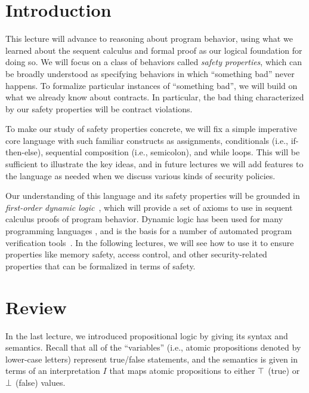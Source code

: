 \documentclass[11pt,twoside]{scrartcl}
\begin{document}
\newcommand{\atrace}{\sigma}%
\newcommand{\stdI}{\dTLint[state=\omega]}%
\newcommand{\Ip}{\dTLint[trace=\atrace]}%

\maketitle
\thispagestyle{empty}


\section{Introduction}

This lecture will advance to reasoning about program behavior, using what we learned about the sequent calculus and formal proof as our logical foundation for doing so. We will focus on a class of behaviors called \emph{safety properties}, which can be broadly understood as specifying behaviors in which ``something bad'' never happens. To formalize particular instances of ``something bad'', we will build on what we already know about contracts. In particular, the bad thing characterized by our safety properties will be contract violations.

To make our study of safety properties concrete, we will fix a simple imperative core language with such familiar constructs as assignments, conditionals (i.e., if-then-else), sequential composition (i.e., semicolon), and while loops. This will be sufficient to illustrate the key ideas, and in future lectures we will add features to the language as needed when we discuss various kinds of security policies.

Our understanding of this language and its safety properties will be grounded in \emph{first-order dynamic logic}~\cite{DBLP:conf/focs/Pratt76,Harel_et_al_2000}, which will provide a set of axioms to use in sequent calculus proofs of program behavior.
Dynamic logic has been used for many programming languages \cite{DBLP:journals/jcss/Kozen85,DBLP:journals/jacm/Peleg87,DBLP:conf/stacs/DrexlerRSSSW93}, and is the basis for a number of automated program verification tools~\cite{DBLP:conf/cade/BeckertP06,DBLP:journals/jar/Platzer08,KeYBook2016,Platzer17}. In the following lectures, we will see how to use it to ensure properties like memory safety, access control, and other security-related properties that can be formalized in terms of safety.

\newpage
\section{Review}
In the last lecture, we introduced propositional logic by giving its syntax and semantics. Recall that all of the ``variables'' (i.e., atomic propositions denoted by lower-case letters) represent true/false statements, and the semantics is given in terms of an interpretation $I$ that maps atomic propositions to either $\top$ (true) or $\bot$ (false) values.
\end{document}
